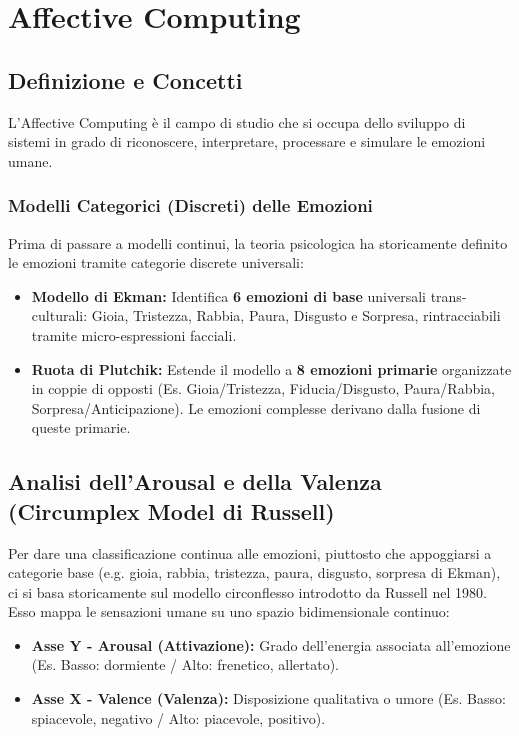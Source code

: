 \chapter{Affective Computing}

\section{Definizione e Concetti}
L'Affective Computing è il campo di studio che si occupa dello sviluppo di sistemi in grado di riconoscere, interpretare, processare e simulare le emozioni umane.

\subsection{Modelli Categorici (Discreti) delle Emozioni}
Prima di passare a modelli continui, la teoria psicologica ha storicamente definito le emozioni tramite categorie discrete universali:
\begin{itemize}
    \item \textbf{Modello di Ekman:} Identifica \textbf{6 emozioni di base} universali trans-culturali: Gioia, Tristezza, Rabbia, Paura, Disgusto e Sorpresa, rintracciabili tramite micro-espressioni facciali.
    \item \textbf{Ruota di Plutchik:} Estende il modello a \textbf{8 emozioni primarie} organizzate in coppie di opposti (Es. Gioia/Tristezza, Fiducia/Disgusto, Paura/Rabbia, Sorpresa/Anticipazione). Le emozioni complesse derivano dalla fusione di queste primarie.
\end{itemize}

\section{Analisi dell'Arousal e della Valenza (Circumplex Model di Russell)}
Per dare una classificazione continua alle emozioni, piuttosto che appoggiarsi a categorie base (e.g. gioia, rabbia, tristezza, paura, disgusto, sorpresa di Ekman), ci si basa storicamente sul modello circonflesso introdotto da Russell nel 1980. Esso mappa le sensazioni umane su uno spazio bidimensionale continuo:
\begin{itemize}
    \item \textbf{Asse Y - Arousal (Attivazione):} Grado dell'energia associata all'emozione (Es. Basso: dormiente / Alto: frenetico, allertato).
    \item \textbf{Asse X - Valence (Valenza):} Disposizione qualitativa o umore (Es. Basso: spiacevole, negativo / Alto: piacevole, positivo).
\end{itemize}

